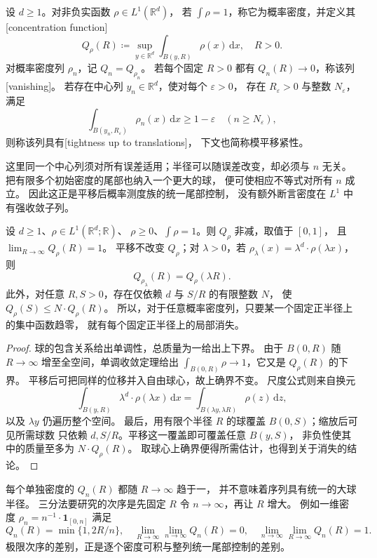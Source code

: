 \begin{definition}[集中函数与模平移质量紧性]
\label{b2:def:F-concentration}
设 \(d\ge1\)。对非负实函数 \(\rho\in L^1(\mathbb R^d)\)，
若 \(\int\rho=1\)，称它为概率密度，并定义其
[concentration function]
\[
 Q_\rho(R)\coloneqq
 \sup_{y\in\mathbb R^d}\int_{B(y,R)}\rho(x)\,\mathrm dx,
 \quad R>0.
\]
对概率密度列 \(\rho_n\)，记 \(Q_n=Q_{\rho_n}\)。
若每个固定 \(R>0\) 都有 \(Q_n(R)\to0\)，称该列
[vanishing]。
若存在中心列 \(y_n\in\mathbb R^d\)，使对每个 \(\varepsilon>0\)，
存在 \(R_\varepsilon>0\) 与整数 \(N_\varepsilon\)，满足
\[
 \int_{B(y_n,R_\varepsilon)}\rho_n(x)\,\mathrm dx
 \ge1-\varepsilon\quad(n\ge N_\varepsilon),
\]
则称该列具有[tightness up to translations]，
下文也简称模平移紧性。
\end{definition}
这里同一个中心列须对所有误差适用；半径可以随误差改变，却必须与 \(n\) 无关。
把有限多个初始密度的尾部也纳入一个更大的球，
便可使相应不等式对所有 \(n\) 成立。
因此这正是平移后概率测度族的统一尾部控制，
没有额外断言密度在 \(L^1\) 中有强收敛子列。

\begin{proposition}[集中函数的基本性质]
\label{b2:prop:F-concentration-function}
设 \(d\ge1\)、\(\rho\in L^1(\mathbb R^d;\mathbb R)\)、
\(\rho\ge0\)、\(\int\rho=1\)。则 \(Q_\rho\) 非减，取值于 \([0,1]\)，
且 \(\lim_{R\to\infty}Q_\rho(R)=1\)。
平移不改变 \(Q_\rho\)；对 \(\lambda>0\)，若
\(\rho_\lambda(x)=\lambda^d\cdot\rho(\lambda x)\)，则
\[
 Q_{\rho_\lambda}(R)=Q_\rho(\lambda R).
\]
此外，对任意 \(R,S>0\)，存在仅依赖 \(d\) 与 \(S/R\) 的有限整数 \(N\)，
使 \(Q_\rho(S)\le N\cdot Q_\rho(R)\)。
所以，对于任意概率密度列，只要某一个固定正半径上的集中函数趋零，
就有每个固定正半径上的局部消失。
\end{proposition}
\begin{proof}
球的包含关系给出单调性，总质量为一给出上下界。
由于 \(B(0,R)\) 随 \(R\to\infty\) 增至全空间，单调收敛定理给出
\(\int_{B(0,R)}\rho\to1\)，它又是 \(Q_\rho(R)\) 的下界。
平移后可把同样的位移并入自由球心，故上确界不变。
尺度公式则来自换元
\[
 \int_{B(y,R)}\lambda^d\cdot\rho(\lambda x)\,\mathrm dx
 =\int_{B(\lambda y,\lambda R)}\rho(z)\,\mathrm dz,
\]
以及 \(\lambda y\) 仍遍历整个空间。
最后，用有限个半径 \(R\) 的球覆盖 \(B(0,S)\)；缩放后可见所需球数
只依赖 \(d,S/R\)。平移这一覆盖即可覆盖任意 \(B(y,S)\)，
非负性使其中的质量至多为 \(N\cdot Q_\rho(R)\)。
取球心上确界便得所需估计，也得到关于消失的结论。
\end{proof}
每个单独密度的 \(Q_n(R)\) 都随 \(R\to\infty\) 趋于一，
并不意味着序列具有统一的大球半径。
三分法要研究的次序是先固定 \(R\) 令 \(n\to\infty\)，再让 \(R\) 增大。
例如一维密度 \(\rho_n=n^{-1}\cdot\mathbf1_{[0,n]}\) 满足
\[
 Q_n(R)=\min\{1,2R/n\},
 \quad
 \lim_{R\to\infty}\lim_{n\to\infty}Q_n(R)=0,
 \quad
 \lim_{n\to\infty}\lim_{R\to\infty}Q_n(R)=1.
\]
极限次序的差别，正是逐个密度可积与整列统一尾部控制的差别。

